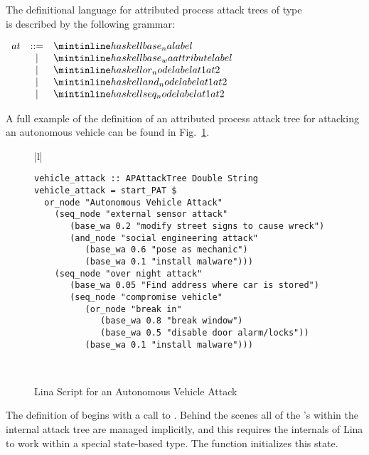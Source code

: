The definitional language for attributed process attack trees of type \\
 is described by the following
grammar:
\begin{center}
  \begin{math}
    \begin{array}{lcl}
      at & ::=  & \mh{base_na label}\\
         & \mid & \mh{base_wa attribute label}\\
         & \mid & \mh{or_node label at1 at2}\\
         & \mid & \mh{and_node label at1 at2}\\
         & \mid & \mh{seq_node label at1 at2}\\
    \end{array}
  \end{math}
\end{center}
A full example of the definition of an attributed process attack tree
for attacking an autonomous vehicle can be found in
Fig.~\ref{fig:vehicle_attack}. 
\begin{figure}
      \begin{tabular}{|l|}
        \hline\\[-7px]
      \begin{minipage}{\textwidth}
        \begin{verbatim}
vehicle_attack :: APAttackTree Double String
vehicle_attack = start_PAT $
  or_node "Autonomous Vehicle Attack"
    (seq_node "external sensor attack"
       (base_wa 0.2 "modify street signs to cause wreck")
       (and_node "social engineering attack"
          (base_wa 0.6 "pose as mechanic")
          (base_wa 0.1 "install malware")))
    (seq_node "over night attack"
       (base_wa 0.05 "Find address where car is stored")
       (seq_node "compromise vehicle"
          (or_node "break in"
             (base_wa 0.8 "break window")
             (base_wa 0.5 "disable door alarm/locks"))
          (base_wa 0.1 "install malware")))
        \end{verbatim}
        \vspace{2px}
      \end{minipage} \\
      \hline
    \end{tabular}
  \caption{Lina Script for an Autonomous Vehicle Attack}
  \label{fig:vehicle_attack}
\end{figure}
The definition of  begins with a call to
.  Behind the scenes all of the 's within the
internal attack tree are managed implicitly, and this requires the
internals of Lina to work within a special state-based type.  The
function  initializes this state.

